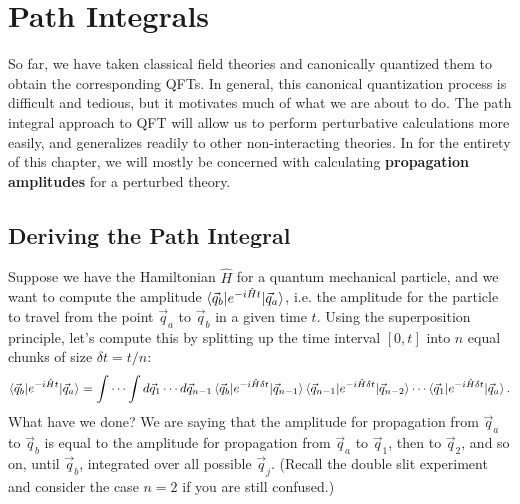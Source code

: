 \documentclass{report}
\theoremstyle{plain}
\theoremstyle{definition}
\theoremstyle{remark}
\begin{document}
\chapter{Path Integrals}

So far, we have taken classical field theories and canonically
quantized them to obtain the corresponding QFTs. In general, this
canonical quantization process is difficult and tedious, but it
motivates much of what we are about to do. The path integral approach
to QFT will allow us to perform perturbative calculations more easily,
and generalizes readily to other non-interacting theories. In
for the entirety of this chapter, we will mostly be
concerned with calculating {\bf propagation amplitudes} for a
perturbed theory.

\section{Deriving the Path Integral}

Suppose we have the Hamiltonian $\hat{H}$ for a quantum mechanical
particle, and we want to compute the amplitude
$\braket{\vec{q}_b|e^{-i\hat{H}t}|\vec{q}_a}$, i.e. the amplitude for
the particle to travel from the point $\vec{q}_a$ to $\vec{q}_b$ in a
given time $t$. Using the superposition principle, let's compute this
by splitting up the time interval $[0, t]$ into $n$ equal chunks of
size $\delta t = t/n$:
$$ \braket{\vec{q}_b|e^{-i\hat{H}t}|\vec{q}_a} = \int \cdots \int d\vec{q}_1 \cdots d\vec{q}_{n-1} \braket{\vec{q}_b|e^{-i\hat{H}\delta t}|\vec{q}_{n-1}} \braket{\vec{q}_{n-1}|e^{-i\hat{H}\delta t}|\vec{q}_{n-2}} \cdots \braket{\vec{q}_1|e^{-i\hat{H}\delta t}|\vec{q}_a}. $$
What have we done? We are saying that the amplitude for propagation
from $\vec{q}_a$ to $\vec{q}_b$ is equal to the amplitude for
propagation from $\vec{q}_a$ to $\vec{q}_1$, then to $\vec{q}_2$, and
so on, until $\vec{q}_b$, integrated over all possible $\vec{q}_j$.
(Recall the double slit experiment and consider the case $n = 2$ if
you are still confused.)
\end{document}
